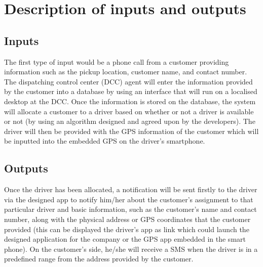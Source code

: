 \documentclass[a4paper,12pt]{article}
\begin{document}
\section{Description of inputs and outputs}
\subsection{Inputs}
The first type of input would be a phone call from a customer providing information such as the pickup location, customer name, and contact number. The dispatching control center (DCC) agent will enter the information provided by the customer into a database by using an interface that will run on a localised desktop at the DCC. Once the information is stored on the database, the system will allocate a customer to a driver based on whether or not a driver is available or not (by using an algorithm designed and agreed upon by the developers). The driver will then be provided with the GPS information of the customer which will be inputted into the embedded GPS on the driver's smartphone.
\pagebreak
\subsection{Outputs}
Once the driver has been allocated, a notification will be sent firstly to the driver via the designed app to notify him/her about the customer’s assignment to that particular driver and basic information, such as the customer’s name and contact number, along with the physical address or GPS coordinates that the customer provided (this can be displayed the driver’s app as link which could launch the designed application for the company or the GPS app embedded in the smart phone). On the customer’s side, he/she will receive a SMS when the driver is in a predefined range from the address provided by the customer.
\end{document}

